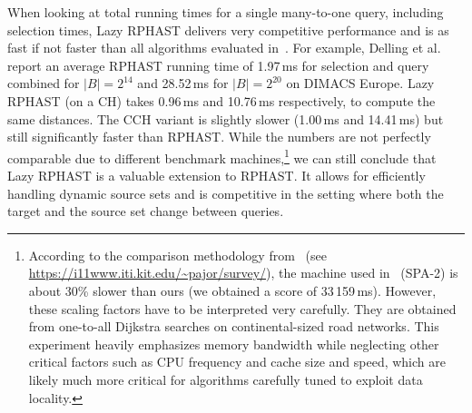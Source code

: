 \documentclass[manuscript,review]{acmart}
\begin{document}
When looking at total running times for a single many-to-one query, including selection times, Lazy RPHAST delivers very competitive performance and is as fast if not faster than all algorithms evaluated in~\cite{delling_et_al:OASIcs:2011:3266}.
For example, Delling et al. report an average RPHAST running time of 1.97\,ms for selection and query combined for $|B| = 2^{14}$ and 28.52\,ms for $|B| = 2^{20}$ on DIMACS Europe.
Lazy RPHAST (on a CH) takes 0.96\,ms and 10.76\,ms respectively, to compute the same distances.
The CCH variant is slightly slower (1.00\,ms and 14.41\,ms) but still significantly faster than RPHAST.
While the numbers are not perfectly comparable due to different benchmark machines,\footnote{
According to the comparison methodology from~\cite{bdgmpsww-rptn-16} (see \url{https://i11www.iti.kit.edu/~pajor/survey/}), the machine used in~\cite{delling_et_al:OASIcs:2011:3266} (SPA-2) is about 30\% slower than ours (we obtained a score of 33\,159\,ms).
However, these scaling factors have to be interpreted very carefully.
They are obtained from one-to-all Dijkstra searches on continental-sized road networks.
This experiment heavily emphasizes memory bandwidth while neglecting other critical factors such as CPU frequency and cache size and speed, which are likely much more critical for algorithms carefully tuned to exploit data locality.
} we can still conclude that Lazy RPHAST is a valuable extension to RPHAST.
It allows for efficiently handling dynamic source sets and is competitive in the setting where both the target and the source set change between queries.

\end{document}
